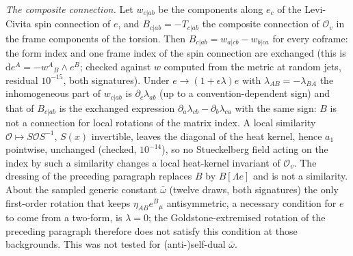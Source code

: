 \emph{The composite connection.} Let \(w_{c|ab}\) be the components along \(e_c\) of the Levi-Civita spin connection of \(e\), and \(B_{c|ab}=-T_{c|ab}\) the composite connection of \(\mathcal O_v\) in the frame components of the torsion. Then \(B_{c|ab}=w_{a|cb}-w_{b|ca}\) for every coframe: the form index and one frame index of the spin connection are exchanged (this is \(\mathrm de^A=-w^A{}_B\wedge e^B\); checked against \(w\) computed from the metric at random jets, residual \(10^{-15}\), both signatures). Under \(e\to(1+\epsilon\lambda)e\) with \(\lambda_{AB}=-\lambda_{BA}\) the inhomogeneous part of \(w_{c|ab}\) is \(\partial_c\lambda_{ab}\) (up to a convention-dependent sign) and that of \(B_{c|ab}\) is the exchanged expression \(\partial_a\lambda_{cb}-\partial_b\lambda_{ca}\) with the same sign: \(B\) is not a connection for local rotations of the matrix index. A local similarity \(\mathcal O\mapsto S\mathcal OS^{-1}\), \(S(x)\) invertible, leaves the diagonal of the heat kernel, hence \(a_1\) pointwise, unchanged (checked, \(10^{-14}\)), so no Stueckelberg field acting on the index by such a similarity changes a local heat-kernel invariant of \(\mathcal O_v\). The dressing of the preceding paragraph replaces \(B\) by \(B[\Lambda e]\) and is not a similarity. About the sampled generic constant \(\bar\omega\) (twelve draws, both signatures) the only first-order rotation that keeps \(\eta_{AB}e^B{}_\mu\) antisymmetric, a necessary condition for \(e\) to come from a two-form, is \(\lambda=0\); the Goldstone-extremised rotation of the preceding paragraph therefore does not satisfy this condition at those backgrounds. This was not tested for (anti-)self-dual \(\bar\omega\).

